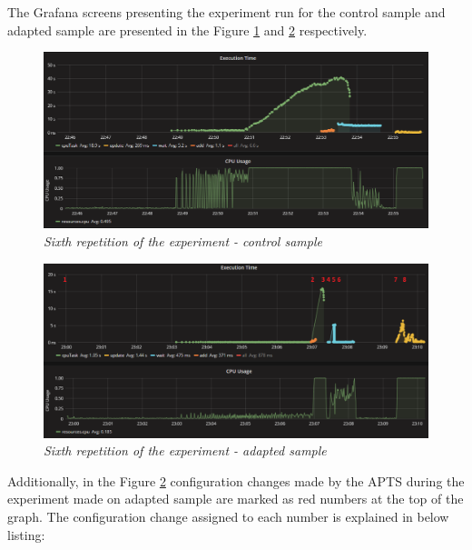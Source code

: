 \documentclass[12pt,a4paper]{article}
\begin{document}
The Grafana screens presenting the experiment run for the control sample and adapted sample are presented in the Figure \ref{figure:random:screen:control:6} and \ref{figure:random:screen:adapted:6} respectively. 

\begin{figure}[!htb]
\centering
\includegraphics[width=1\textwidth]{6-ctrl}
\caption{\textit{Sixth repetition of the experiment - control sample}} \label{figure:random:screen:control:6}
\end{figure}

\begin{figure}[!htb]
\centering
\includegraphics[width=1\textwidth]{6-adap}
\caption{\textit{Sixth repetition of the experiment - adapted sample}} \label{figure:random:screen:adapted:6}
\end{figure}

Additionally, in the Figure \ref{figure:random:screen:adapted:6} configuration changes made by the APTS during the experiment made on adapted sample are marked as red numbers at the top of the graph. The configuration change assigned to each number is explained in below listing: 
\end{document}
